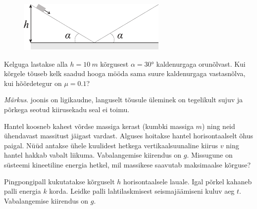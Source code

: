 \documentclass[10pt, twoside]{article}
\begin{document}
{\bigskip


\begin{figure}
	\begin{center}
		\vspace{-20pt}
		\hspace{-10pt}
		\includegraphics[width=\linewidth]{2008-lahg-02-yl}
	\end{center}
\end{figure}
Kelguga lastakse alla $h = \SI{10}{m}$ kõrgusest $\alpha = \ang{30}$ kaldenurgaga orunõlvast. Kui kõrgele tõuseb kelk saadud hooga mööda sama suure kaldenurgaga vastasnõlva, kui hõõrdetegur on $\mu = \num{0,1}$? 

\emph{Märkus}. joonis on ligikaudne, languselt tõusule üleminek on tegelikult sujuv ja põrkega seotud kiirusekadu seal ei toimu.
\probend
\bigskip


Hantel koosneb kahest võrdse massiga kerast (kumbki massiga $m$) ning neid ühendavast massitust jäigast vardast. Alguses hoitakse hantel horisontaalselt õhus paigal. Nüüd antakse ühele kuulidest hetkega vertikaalsuunaline kiirus $v$ ning hantel hakkab vabalt liikuma. Vabalangemise kiirendus on $g$. Missugune on süsteemi kineetiline energia hetkel, mil massikese saavutab maksimaalse kõrguse?
\probend
\bigskip


Pingpongipall kukutatakse kõrguselt $h$ horisontaalsele lauale. Igal põrkel kahaneb palli energia $k$ korda. Leidke palli lahtilaskmisest seismajäämiseni kuluv aeg $t$. Vabalangemise kiirendus on $g$.
\probend
\bigskip

}
\end{document}
